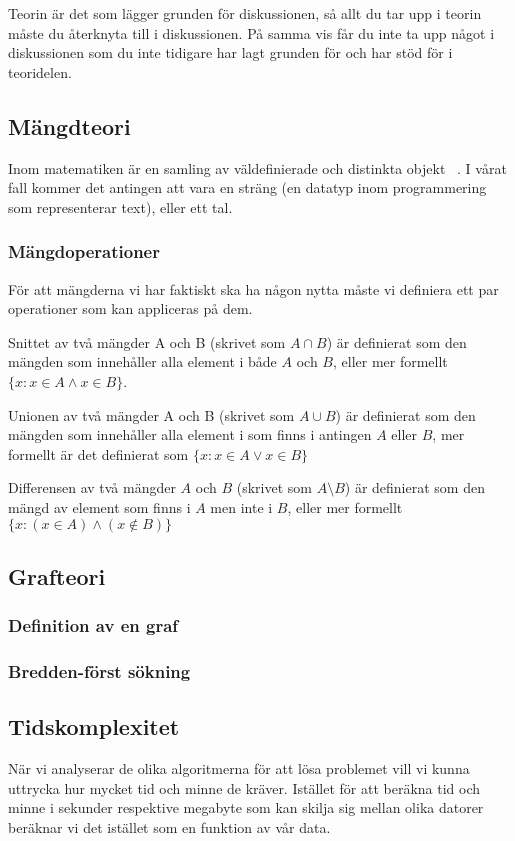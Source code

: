 \documentclass{article}
\begin{document}
Teorin är det som lägger grunden för diskussionen, så allt du tar upp i teorin måste du återknyta till i diskussionen. På samma vis får du inte ta upp något i diskussionen som du inte tidigare har lagt grunden för och har stöd för i teoridelen.

\subsection{Mängdteori}
Inom matematiken är en samling av väldefinierade och distinkta objekt ~\cite{wiki:set}. I vårat fall kommer det antingen att vara en sträng (en datatyp inom programmering som representerar text), eller ett tal.

\subsubsection{Mängdoperationer}
För att mängderna vi har faktiskt ska ha någon nytta måste vi definiera ett par operationer som kan appliceras på dem. 

Snittet av två mängder A och B (skrivet som $A \cap B$) är definierat som den mängden som innehåller alla element i både $A$ och $B$, eller mer formellt $\{x : x \in A \land x \in B\}$. 

Unionen av två mängder A och B (skrivet som $A \cup B$) är definierat som den mängden som innehåller alla element i som finns i antingen $A$ eller $B$, mer formellt är det definierat som $\{x : x \in A \lor x \in B\}$

Differensen av två mängder $A$ och $B$ (skrivet som $A \setminus B$) är definierat som den mängd av element som finns i $A$ men inte i $B$, eller mer formellt $\{x : (x \in A) \land (x \notin B) \}$


\subsection{Grafteori}


\subsubsection{Definition av en graf}


\subsubsection{Bredden-först sökning}


\subsection{Tidskomplexitet}
När vi analyserar de olika algoritmerna för att lösa problemet vill vi kunna uttrycka hur mycket tid och minne de kräver. Istället för att beräkna tid och minne i sekunder respektive megabyte som kan skilja sig mellan olika datorer beräknar vi det istället som en funktion av vår data. 
\end{document}

